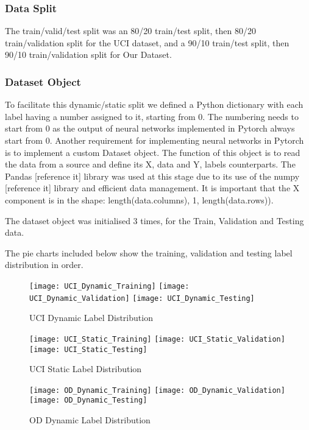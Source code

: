\subsubsection{Data Split}
The train/valid/test split was an 80/20 train/test split, then 80/20 train/validation split for the UCI dataset, and a 90/10 train/test split, then 90/10 train/validation split for Our Dataset.

\subsubsection{Dataset Object}
To facilitate this dynamic/static split we defined a Python dictionary with each label having a number assigned to it, starting from 0.
The numbering needs to start from 0 as the output of neural networks implemented in Pytorch always start from 0.
Another requirement for implementing neural networks in Pytorch is to implement a custom Dataset object.
The function of this object is to read the data from a source and define its X, data and Y, labels counterparts.
The Pandas [reference it] library was used at this stage due to its use of the numpy [reference it] library and efficient data management.
It is important that the X component is in the shape: length(data.columns), 1, length(data.rows)).

The dataset object was initialised 3 times, for the Train, Validation and Testing data.

The pie charts included below show the training, validation and testing label distribution in order.

\begin{figure}[h]
\centering
\texttt{[image: UCI\_Dynamic\_Training]}\hfill
\texttt{[image: UCI\_Dynamic\_Validation]}\hfill
\texttt{[image: UCI\_Dynamic\_Testing]}
\caption{UCI Dynamic Label Distribution}
\label{fig:UCI_Dynamic_Distribution}
\end{figure}

\begin{figure}[h]
\centering
\texttt{[image: UCI\_Static\_Training]}\hfill
\texttt{[image: UCI\_Static\_Validation]}\hfill
\texttt{[image: UCI\_Static\_Testing]}
\caption{UCI Static Label Distribution}
\label{fig:UCI_Static_Distribution}
\end{figure}

\begin{figure}[h]
\centering
\texttt{[image: OD\_Dynamic\_Training]}\hfill
\texttt{[image: OD\_Dynamic\_Validation]}\hfill
\texttt{[image: OD\_Dynamic\_Testing]}
\caption{OD Dynamic Label Distribution}
\label{fig:OD_Dynamic_Distribution}
\end{figure}

